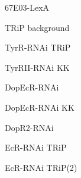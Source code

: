 \documentclass[17pt]{extarticle}
\begin{document}
\newpage{}
\vspace*{\fill}\begin{large}
67E03-LexA \\[0.5em]
\end{large}
\footnotesize
\vspace*{\fill}
\newpage{}
\vspace*{\fill}\begin{normalsize}
TRiP background \\[0.5em]
\end{normalsize}
\footnotesize
\vspace*{\fill}
\newpage{}
\vspace*{\fill}\begin{normalsize}
TyrR-RNAi TRiP \\[0.5em]
\end{normalsize}
\footnotesize
\vspace*{\fill}
\newpage{}
\vspace*{\fill}\begin{normalsize}
TyrRII-RNAi KK \\[0.5em]
\end{normalsize}
\footnotesize
\vspace*{\fill}
\newpage{}
\vspace*{\fill}\begin{normalsize}
DopEcR-RNAi \\[0.5em]
\end{normalsize}
\footnotesize
\vspace*{\fill}
\newpage{}
\vspace*{\fill}\begin{normalsize}
DopEcR-RNAi KK \\[0.5em]
\end{normalsize}
\footnotesize
\vspace*{\fill}
\newpage{}
\vspace*{\fill}\begin{large}
DopR2-RNAi \\[0.5em]
\end{large}
\footnotesize
\vspace*{\fill}
\newpage{}
\vspace*{\fill}\begin{normalsize}
EcR-RNAi TRiP \\[0.5em]
\end{normalsize}
\footnotesize
\vspace*{\fill}
\newpage{}
\vspace*{\fill}\begin{small}
EcR-RNAi TRiP(2) \\[0.5em]
\end{small}
\end{document}
